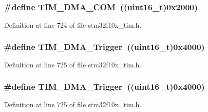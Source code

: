 \subsubsection[{\texorpdfstring{T\+I\+M\+\_\+\+D\+M\+A\+\_\+\+C\+OM}{TIM_DMA_COM}}]{\setlength{\rightskip}{0pt plus 5cm}\#define T\+I\+M\+\_\+\+D\+M\+A\+\_\+\+C\+OM~(({\bf uint16\+\_\+t})0x2000)}\hypertarget{group___t_i_m___d_m_a__sources_gac5f4c56e944bda8ba0c23b97275020ba}{}\label{group___t_i_m___d_m_a__sources_gac5f4c56e944bda8ba0c23b97275020ba}


Definition at line 724 of file stm32f10x\+\_\+tim.\+h.

\subsubsection[{\texorpdfstring{T\+I\+M\+\_\+\+D\+M\+A\+\_\+\+Trigger}{TIM_DMA_Trigger}}]{\setlength{\rightskip}{0pt plus 5cm}\#define T\+I\+M\+\_\+\+D\+M\+A\+\_\+\+Trigger~(({\bf uint16\+\_\+t})0x4000)}\hypertarget{group___t_i_m___d_m_a__sources_ga81ad169a378969524e61396337d84a0a}{}\label{group___t_i_m___d_m_a__sources_ga81ad169a378969524e61396337d84a0a}


Definition at line 725 of file stm32f10x\+\_\+tim.\+h.

\subsubsection[{\texorpdfstring{T\+I\+M\+\_\+\+D\+M\+A\+\_\+\+Trigger}{TIM_DMA_Trigger}}]{\setlength{\rightskip}{0pt plus 5cm}\#define T\+I\+M\+\_\+\+D\+M\+A\+\_\+\+Trigger~(({\bf uint16\+\_\+t})0x4000)}\hypertarget{group___t_i_m___d_m_a__sources_ga81ad169a378969524e61396337d84a0a}{}\label{group___t_i_m___d_m_a__sources_ga81ad169a378969524e61396337d84a0a}


Definition at line 725 of file stm32f10x\+\_\+tim.\+h.


